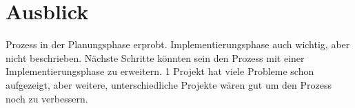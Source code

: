 \section{Ausblick}
Prozess in der Planungsphase erprobt. Implementierungsphase auch wichtig, aber nicht beschrieben. Nächste Schritte könnten sein den Prozess mit einer Implementierungsphase zu erweitern. 1 Projekt hat viele Probleme schon aufgezeigt, aber weitere, unterschiedliche Projekte wären gut um den Prozess noch zu verbessern.